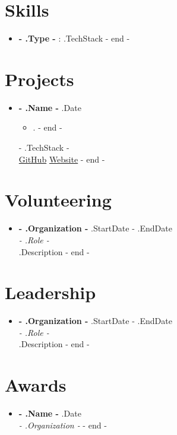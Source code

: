 \documentclass[11pt]{article}
\begin{document}
\section*{Skills}
\begin{itemize}[leftmargin=*]
    {{- range .Skills -}}
    \item \textbf{ {{- .Type -}} }: {{ .TechStack }}
    {{- end -}}
\end{itemize}

\section*{Projects}
\begin{itemize}[leftmargin=*]
    {{- range .Projects -}}
    \item \textbf{ {{- .Name -}} } \hfill {{ .Date }} \\
    \begin{itemize}
        {{- range .Description -}}
        \item {{ . }}
        {{- end -}}
    \end{itemize}
    {{- .TechStack -}} \\
    \href{ {{- .Github -}} }{GitHub} \hspace{1em} \href{ {{- .Website -}} }{Website}
    {{- end -}}
\end{itemize}

\section*{Volunteering}
\begin{itemize}[leftmargin=*]
    {{- range .Volunteerships -}}
    \item \textbf{ {{- .Organization -}} } \hfill {{ .StartDate }} - {{ .EndDate }} \\
    \textit{ {{- .Role -}} } \\
    {{ .Description }}
    {{- end -}}
\end{itemize}

\section*{Leadership}
\begin{itemize}[leftmargin=*]
    {{- range .Leaderships -}}
    \item \textbf{ {{- .Organization -}} } \hfill {{ .StartDate }} - {{ .EndDate }} \\
    \textit{ {{- .Role -}} } \\
    {{ .Description }}
    {{- end -}}
\end{itemize}

\section*{Awards}
\begin{itemize}[leftmargin=*]
    {{- range .Awards -}}
    \item \textbf{ {{- .Name -}} } \hfill {{ .Date }} \\
    \textit{ {{- .Organization -}} }
    {{- end -}}
\end{itemize}
\end{document}
